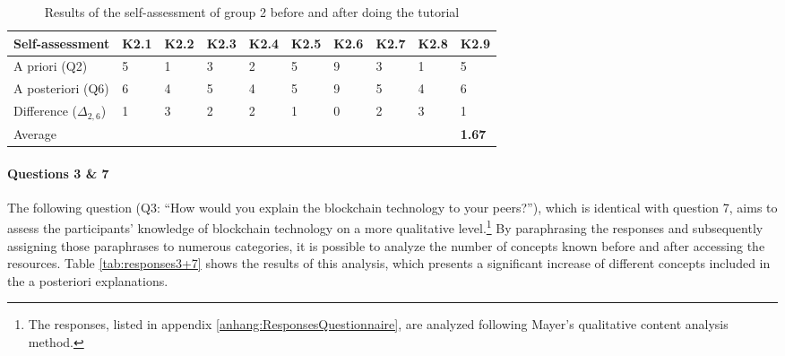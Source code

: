 \begin{table}[]
    \centering
    \begin{tabular}{l | l l l l l l l l l }
         Self-assessment & K2.1 & K2.2 & K2.3 & K2.4 & K2.5 & K2.6 & K2.7 & K2.8 & K2.9  \\
         \hline
         A priori (Q2) & 5 & 1 & 3 & 2 & 5 & 9 & 3 & 1 & 5 \\
         A posteriori (Q6) & 6 & 4 & 5 & 4 & 5 & 9 & 5 & 4 & 6 \\
         \hline
         Difference ($\Delta_{2,6}$) & 1 & 3 & 2 & 2 & 1 & 0 & 2 & 3 & 1 \\
         Average & & & & & & & & & \cellcolor[gray]{0.9} \textbf{1.67} \\
    \end{tabular}
    \caption{Results of the self-assessment of group 2 before and after doing the tutorial}
    \label{tab:EvalResultsYesNoTUTORIAL}
\end{table}

\paragraph{Questions 3 \& 7} The following question (Q3: \enquote{How would you explain the blockchain technology to your peers?}), which is identical with question 7, aims to assess the participants' knowledge of blockchain technology on a more qualitative level.\footnote{The responses, listed in appendix \ref{anhang:ResponsesQuestionnaire}, are analyzed following Mayer's qualitative content analysis method.} By paraphrasing the responses and subsequently assigning those paraphrases to numerous categories, it is possible to analyze the number of concepts known before and after accessing the resources. Table \ref{tab:responses3+7} shows the results of this analysis, which presents a significant increase of different concepts included in the a posteriori explanations.

